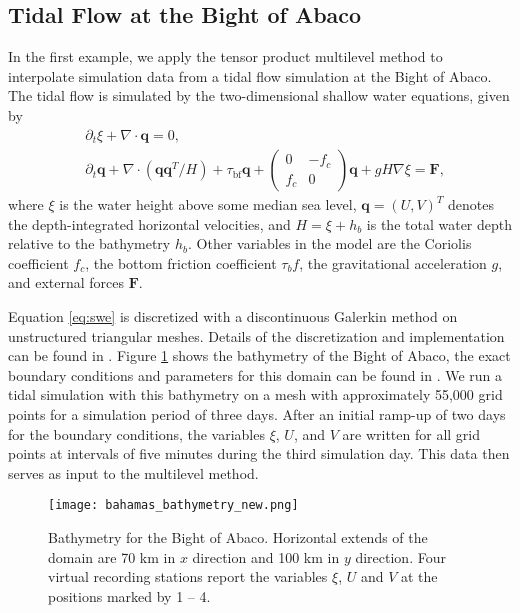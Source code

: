 \documentclass[	a4paper, 
								11pt]{article}
\theoremstyle{plain}
\begin{document}
\subsection{Tidal Flow at the Bight of Abaco}\label{subsex:TidalFlow}
In the first example, we apply the tensor product multilevel method to interpolate simulation data from a tidal flow simulation at the Bight of Abaco. 
The tidal flow is simulated by the two-dimensional shallow water equations, given by
\begin{equation}
\label{eq:swe}
\begin{aligned}
&\partial_t \xi+\nabla \cdot \boldsymbol{q}=0,\\
&\partial_t \boldsymbol{q}
+\nabla \cdot \left(\boldsymbol{qq}^T /H \right)
+\tau_{\textrm{bf}} \boldsymbol{q}
+\left( \begin{smallmatrix} 0 & -f_c\\ f_c & 0 \end{smallmatrix} \right) \boldsymbol{q}
+gH\nabla\xi
=\boldsymbol{F},
\end{aligned}
\end{equation}
where $\xi$ is the water height above some median sea level, $\boldsymbol{q} = (U, V)^T$ denotes the depth-integrated horizontal velocities, and $H = \xi + h_b$ is the total water depth relative to the bathymetry $h_b$.
Other variables in the model are the Coriolis coefficient $f_c$, the bottom friction coefficient $\tau_bf$, the gravitational acceleration $g$, and external forces $\boldsymbol{F}$.

Equation \eqref{eq:swe} is discretized with a discontinuous Galerkin method on unstructured triangular meshes. Details of the discretization and implementation can be found in \cite{buettner:ShallowWaterDG}. 
Figure \ref{fig:bahamas-bathymetry} shows the bathymetry of the Bight of Abaco, the exact boundary conditions and parameters for this domain can be found in \cite[Section 2.3]{buettner:ShallowWaterDG}. 
We run a tidal simulation with this bathymetry on a mesh with approximately 55,000 grid points for a simulation period of three days. After an initial ramp-up of two days for the boundary conditions, the variables $\xi$, $U$, and $V$ are written for all grid points at intervals of five minutes during the third simulation day. This data then serves as input to the multilevel method.

\begin{figure}
    \centering
    \texttt{[image: bahamas\_bathymetry\_new.png]}
    \caption{Bathymetry for the Bight of Abaco. Horizontal extends of the domain are 70 km in $x$ direction and 100 km in $y$ direction. Four virtual recording stations report the variables $\xi$, $U$ and $V$ at the positions marked by 1 -- 4.}
    \label{fig:bahamas-bathymetry}
\end{figure}
\end{document}
